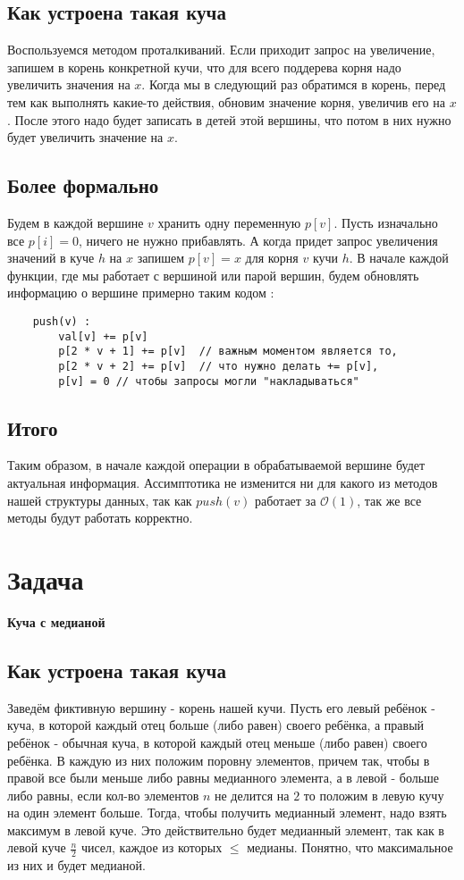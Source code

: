 \documentclass{article}
\begin{document}
\subsection*{Как устроена такая куча}
Воспользуемся методом проталкиваний. Если приходит запрос на увеличение, запишем в корень конкретной кучи, что для всего поддерева корня надо увеличить значения на $x$. Когда мы в следующий раз обратимся в корень, перед тем как выполнять какие-то действия, обновим значение корня, увеличив его на $x$. После этого надо будет записать в детей этой вершины, что потом в них нужно будет увеличить значение на $x$.
\subsection*{Более формально}
Будем в каждой вершине $v$ хранить одну переменную $p[v]$.
Пусть изначально все $p[i] = 0$, ничего не нужно прибавлять. А когда придет запрос увеличения значений в куче $h$ на $x$ запишем $p[v] = x$ для корня $v$ кучи $h$. В начале каждой функции, где мы работает с вершиной или парой вершин, будем обновлять информацию о вершине примерно таким кодом :
\begin{verbatim}
    push(v) :
        val[v] += p[v]
        p[2 * v + 1] += p[v]  // важным моментом является то,
        p[2 * v + 2] += p[v]  // что нужно делать += p[v], 
        p[v] = 0 // чтобы запросы могли "накладываться"
\end{verbatim}

\subsection*{Итого}
Таким образом, в начале каждой операции в обрабатываемой вершине будет актуальная информация. Ассимптотика не изменится ни для какого из методов нашей структуры данных, так как $push(v)$ работает за $\mathcal{O}(1)$, так же все методы будут работать корректно.

\section*{Задача }
\textbf{Куча с медианой}
\subsection*{Как устроена такая куча}
Заведём фиктивную вершину - корень нашей кучи. Пусть его левый ребёнок - куча, в которой каждый отец больше (либо равен) своего ребёнка, а правый ребёнок - обычная куча, в которой каждый отец меньше (либо равен) своего ребёнка. 
\newline
В каждую из них положим поровну элементов, причем так, чтобы в правой все были меньше либо равны медианного элемента, а в левой - больше либо равны, если кол-во элементов $n$ не делится на $2$ то положим в левую кучу на один элемент больше.
\newline
Тогда, чтобы получить медианный элемент, надо взять максимум в левой куче. 
Это действительно будет медианный элемент, так как в левой куче $\frac{n}{2}$ чисел, каждое из которых $\leq$ медианы. Понятно, что максимальное из них и будет медианой.
\end{document}
